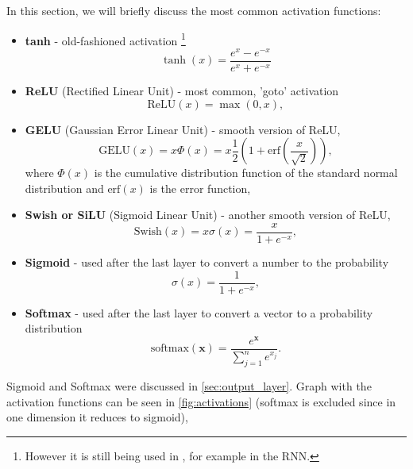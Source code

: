 In this section, we will briefly discuss the most common activation functions:
\begin{itemize}
    \item \textbf{tanh} - old-fashioned \ml activation \footnote{However it is still being used in \dl, for example in the RNN\cite{rnn}.} 
    \begin{equation}
        \tanh(x) = \frac{e^x - e^{-x}}{e^x + e^{-x}}
    \end{equation}
    \item \textbf{ReLU} (Rectified Linear Unit) - most common, 'goto' \dl activation 
    \begin{equation}
        \text{ReLU}(x) = \max(0,x),
    \end{equation}
    \item \textbf{GELU} (Gaussian Error Linear Unit) \cite{gelu} - smooth version of ReLU,  
    \begin{equation}
        \text{GELU}(x) = x\Phi(x) = x\frac{1}{2}\left(1 + \text{erf}\left(\frac{x}{\sqrt{2}}\right)\right),
    \end{equation}
    where $\Phi(x)$ is the cumulative distribution function of the standard normal distribution and $\text{erf}(x)$ is the error function,
    \item \textbf{Swish or SiLU} (Sigmoid Linear Unit) \cite{swish} - another smooth version of ReLU, 
    \begin{equation}
        \text{Swish}(x) = x\sigma(x) = \frac{x}{1 + e^{-x}},
    \end{equation}
    \item \textbf{Sigmoid} - used after the last layer to convert a number to the probability 
    \begin{equation}
        \sigma(x) = \frac{1}{1 + e^{-x}},
    \end{equation}
    \item \textbf{Softmax} - used after the last layer to convert a vector to a probability distribution 
    \begin{equation}
        \text{softmax}(\pmb{x}) = \frac{e^{\pmb{x}}}{\sum_{j=1}^n e^{x_j}}.
    \end{equation}
\end{itemize}
Sigmoid and Softmax were discussed in \cref{sec:output_layer}.
Graph with the activation functions can be seen in \cref{fig:activations} (softmax is excluded since in one dimension it reduces to sigmoid),
